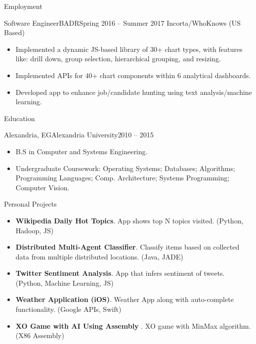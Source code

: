 \documentclass[]{ahmedamrcv}
\begin{document}
\begin{cvsection}{Employment}
		\begin{cvsubsection}{Software Engineer}{BADR}{Spring 2016 -- Summer 2017}
            {Incorta/WhoKnows} (US Based)
			\begin{itemize}
				\item Implemented a dynamic JS-based library of 30+ chart types, with features like: drill down, group selection, hierarchical grouping, and resizing.
				\item Implemented APIs for 40+ chart components within 6 analytical dashboards.
				\item Developed app to enhance job/candidate hunting using text analysis/machine learning.
			\end{itemize}
		\end{cvsubsection}
	\end{cvsection}
	
	\begin{cvsection}{Education}
		\begin{cvsubsection}{Alexandria, EG}{Alexandria University}{2010 -- 2015}
			\begin{itemize}
				\item B.S in Computer and Systems Engineering.
				\item Undergraduate Coursework: Operating Systems; Databases; Algorithms; Programming Languages; Comp. Architecture; Systems Programming; Computer Vision.
			\end{itemize}
		\end{cvsubsection}
	\end{cvsection}
	
	\begin{cvsection}{Personal Projects}
		\begin{cvsubsection}{}{}{}
			\begin{itemize}
    			\item \textbf{Wikipedia Daily Hot Topics}. App shows top N topics visited. (Python, Hadoop, JS)
				\item \textbf{Distributed Multi-Agent Classifier}. Classify items based on collected data from multiple distributed locations. (Java, JADE)
				\item \textbf{Twitter Sentiment Analysis}. App that infers sentiment of tweets. (Python, Machine Learning, JS)
				\item \textbf{Weather Application (iOS)}. Weather App along with auto-complete functionality. (Google APIs, Swift)
				\item \textbf{XO Game with AI Using Assembly }. XO game with MinMax algorithm. (X86 Assembly)
			\end{itemize}
		\end{cvsubsection}
	\end{cvsection}
	
\end{document}
